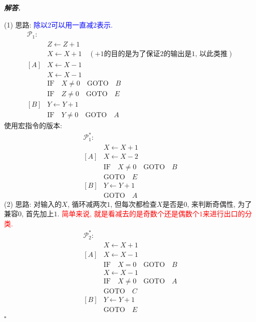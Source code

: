 \documentclass[10pt, a4paper, oneside]{ctexart}
\newenvironment{solution}{%
  \par\noindent\textbf{\textit{解答. }}\ignorespaces
}{%
  \hfill\ensuremath{\square}\par
}
\begin{document}
    \begin{solution}
        (1) 思路: \textcolor{blue}{除以$2$可以用一直减$2$表示.}
        \begin{align*}
            \mathscr{P}_1:&\\
            &Z\leftarrow Z+1\\
            &X\leftarrow X+1\quad(\text{$+1$的目的是为了保证$2$的输出是$1$, 以此类推})\\
            [A]&X \leftarrow X-1\\
            &X \leftarrow X-1\\
            &\text{IF} \quad X\neq 0 \quad \text{GOTO} \quad B\\
            &\text{IF} \quad Z\neq 0 \quad \text{GOTO} \quad E\\
            [B]&Y\leftarrow Y+1\\
            &\text{IF} \quad Y\neq 0 \quad \text{GOTO} \quad A
        \end{align*}
        使用宏指令的版本:
        \begin{align*}
            \mathscr{P}_1^*:&\\
            &X\leftarrow X+1\\
            [A]&X \leftarrow X-2\\
            &\text{IF} \quad X\neq 0 \quad \text{GOTO} \quad B\\
            & \text{GOTO}\quad E\\
            [B]&Y\leftarrow Y+1\\
            &\text{GOTO}\quad A
        \end{align*}
        (2) 思路: 对输入的$X$, 循环减两次$1$, 但每次都检查$X$是否是$0$, 来判断奇偶性, 为了兼容$0$, 首先加上$1$. \textcolor{red}{简单来说, 就是看减去的是奇数个还是偶数个$1$来进行出口的分类.}
        \begin{align*}
            \mathscr{P}_2^*:&\\
            &X\leftarrow X+1\\
            [A]&X\leftarrow X-1\\
            &\text{IF}\quad X=0 \quad \text{GOTO}\quad  B\\
            &X\leftarrow X-1\\
            &\text{IF}\quad X\neq 0 \quad \text{GOTO}\quad  A\\
            & \text{GOTO} \quad C\\
            [B]&Y\leftarrow Y+1\\
            &\text{GOTO}\quad E\\

\end{align*}
\end{solution}
\end{document}
